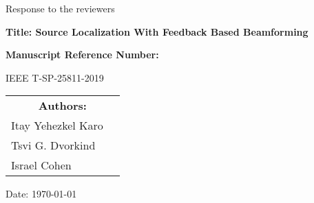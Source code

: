 \begin{titlepage}
\centering
{\LARGE Response to the reviewers\par}
\vspace{1.5cm}

{\large \bfseries Title: Source Localization With Feedback Based Beamforming	 \par}
\vspace{1.5cm}
    
    {\large \bfseries Manuscript Reference Number: \par
    IEEE T-SP-25811-2019}
\vspace{1.5cm}
  
\begin{table}[h!]
\renewcommand{\arraystretch}{1}
\centering
\begin{tabular}{lc}
\multicolumn{2}{c}{\large \bfseries Authors:} \\
\large Itay Yehezkel Karo \\
\large Tsvi G. Dvorkind \\
\large Israel Cohen \\
\end{tabular}
\end{table}
\vspace{1.5cm}
\large{Date: \today}

\end{titlepage}
